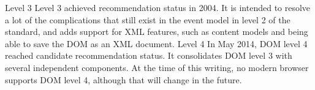 Level 3
Level 3 achieved recommendation status in 2004. It is intended to resolve a lot of the complications
that still exist in the event model in level 2 of the standard, and adds support for XML features,
such as content models and being able to save the DOM as an XML document.
Level 4
In May 2014, DOM level 4 reached candidate recommendation status. It consolidates DOM level 3
with several independent components. At the time of this writing, no modern browser supports
DOM level 4, although that will change in the future.